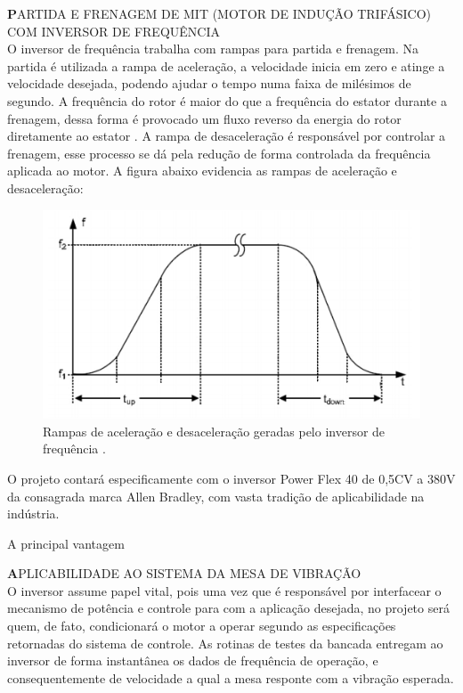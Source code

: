      \textbf PARTIDA E FRENAGEM DE MIT (MOTOR DE INDUÇÃO TRIFÁSICO) COM INVERSOR DE FREQUÊNCIA\\
     
     O inversor de frequência trabalha com rampas para partida e frenagem. Na partida é utilizada a rampa de aceleração, a velocidade inicia em zero e atinge a velocidade desejada, podendo ajudar o tempo numa faixa de milésimos de segundo. 
    A frequência do rotor é maior do que a frequência do estator durante a frenagem, dessa forma é provocado um fluxo reverso da energia do rotor diretamente ao estator \cite{covino}. A rampa de desaceleração é responsável por controlar a frenagem, esse processo se dá pela redução de forma controlada da frequência aplicada ao motor.
    A figura abaixo evidencia as rampas de aceleração e desaceleração:\\

 \begin{figure}[h]    
 		\centering
		\label{oldr}
		\includegraphics[keepaspectratio=true,scale=0.75]{figuras/rampa_aceleracao.png}
		\caption{Rampas de aceleração e desaceleração geradas pelo inversor de frequência \cite{siemens}.}
		\end{figure}  
        
        
        O projeto contará especificamente com o inversor Power Flex 40 de 0,5CV a 380V da consagrada marca Allen Bradley, com vasta tradição de aplicabilidade na indústria. 
        
        
        A principal vantagem 
        
        
\textbf APLICABILIDADE AO SISTEMA DA MESA DE VIBRAÇÃO\\

O inversor assume papel vital, pois uma vez que é responsável por interfacear o mecanismo de potência e controle para com a aplicação desejada, no projeto será quem, de fato, condicionará o motor a operar segundo as especificações retornadas do sistema de controle. As rotinas de testes da bancada entregam ao inversor de forma instantânea os dados de frequência de operação, e consequentemente de velocidade a qual a mesa responte com a vibração esperada. 

